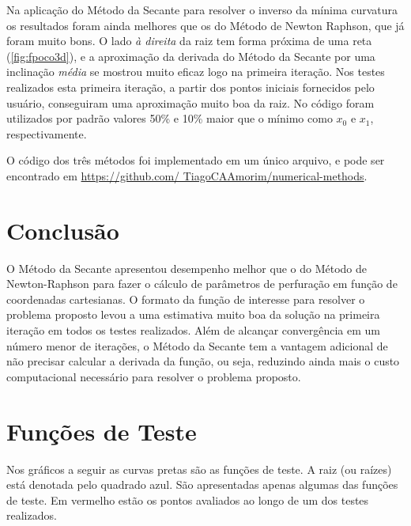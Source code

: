 \documentclass[final,5p]{elsarticle}
\numberwithin{equation}{section}
\begin{document}
    Na aplicação do Método da Secante para resolver o inverso da mínima curvatura os resultados foram ainda melhores que os do Método de Newton Raphson, que já foram muito bons. O lado \emph{à direita} da raiz tem forma próxima de uma reta (\ref{fig:fpoco3d}), e a aproximação da derivada do Método da Secante por uma inclinação \emph{média} se mostrou muito eficaz logo na primeira iteração. Nos testes realizados esta primeira iteração, a partir dos pontos iniciais fornecidos pelo usuário, conseguiram uma aproximação muito boa da raiz.
    No código foram utilizados por padrão valores 50\% e 10\% maior que o mínimo como $x_0$ e $x_1$, respectivamente. 

    O código dos três métodos foi implementado em um único arquivo, e pode ser encontrado em \href{https://github.com/TiagoCAAmorim/numerical-methods/blob/main/03_Secante/03_secante.c}{https://github.com/ TiagoCAAmorim/numerical-methods}.

    \section{Conclusão}
    
    O Método da Secante apresentou desempenho melhor que o do Método de Newton-Raphson para fazer o cálculo de parâmetros de perfuração em função de coordenadas cartesianas. O formato da função de interesse para resolver o problema proposto levou a uma estimativa muito boa da solução na primeira iteração em todos os testes realizados. Além de alcançar convergência em um número menor de iterações, o Método da Secante tem a vantagem adicional de não precisar calcular a derivada da função, ou seja, reduzindo ainda mais o custo computacional necessário para resolver o problema proposto.

    

\appendix

\section{Funções de Teste}

Nos gráficos a seguir as curvas pretas são as funções de teste. A raiz (ou raízes) está denotada pelo quadrado azul. São apresentadas apenas algumas das funções de teste. Em vermelho estão os pontos avaliados ao longo de um dos testes realizados.
\end{document}
